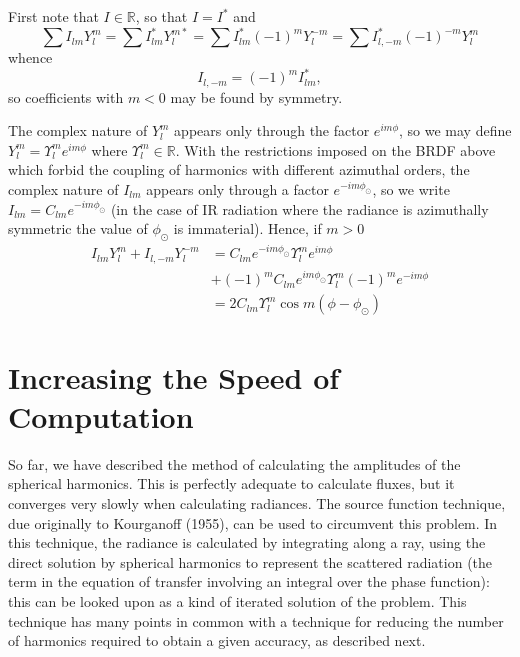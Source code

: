First note that $I\in\mathbb{R}$, so that $I=I^*$ and
\begin{equation}
\sum I_{lm} Y_l^m = \sum I_{lm}^* Y_l^{m*} = \sum I_{lm}^* (-1)^m Y_l^{-m}
= \sum I_{l,-m}^* (-1)^{-m} Y_l^{m}
\end{equation}
whence
\begin{equation}
I_{l,-m}= (-1)^m I_{lm}^* ,
\end{equation}
so coefficients with $m<0$ may be found by symmetry.

The complex nature of $Y_l^m$ appears only through the factor $e^{im\phi}$, so
we may define $Y_l^m=\Upsilon_l^m e^{im\phi}$ where $\Upsilon_l^m \in 
\mathbb{R}$. With the restrictions imposed on the BRDF above which forbid
the coupling of harmonics with different azimuthal orders, the complex
nature of $I_{lm}$ appears only through a factor $e^{-im\phi_\odot}$, so
we write $I_{lm}=C_{lm}e^{-im\phi_\odot}$ (in the case of IR radiation
where the radiance is azimuthally symmetric the value of $\phi_\odot$ is 
immaterial). Hence, if $m>0$
\begin{equation}
\begin{split}
I_{lm} Y_l^m + I_{l,-m} Y_l^{-m} &= C_{lm} e^{-im\phi_\odot} 
\Upsilon_l^m e^{im\phi} \\
&+ (-1)^m C_{lm} e^{im\phi_\odot}
\Upsilon_l^m (-1)^m e^{-im\phi} \\
&= 2C_{lm} \Upsilon_l^m \cos m(\phi-\phi_\odot)
\end{split}
\end{equation}


\section{Increasing the Speed of Computation}

So far, we have described the method of calculating the amplitudes of the
spherical harmonics. This is perfectly adequate to calculate fluxes, but
it converges very slowly when calculating radiances. The source function
technique, due originally to Kourganoff (1955), can be used to circumvent
this problem. In this technique, the radiance is calculated by integrating
along a ray, using the direct solution by spherical harmonics to represent
the scattered radiation (the term in the equation of transfer involving
an integral over the phase function): this can be looked upon as a kind
of iterated solution of the problem. This technique has many points in
common with a technique for reducing the number of harmonics required
to obtain a given accuracy, as described next.

